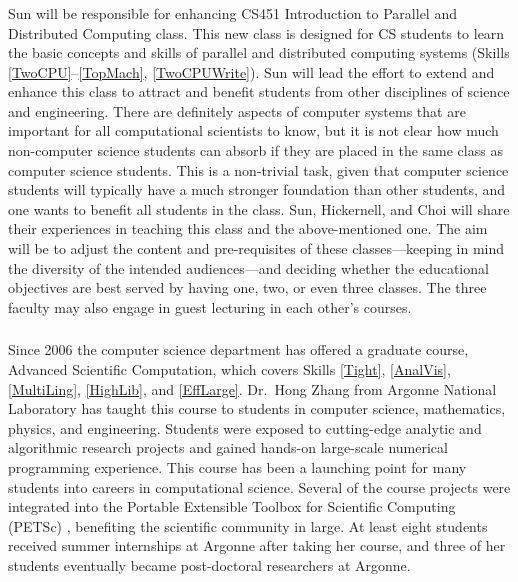 \documentclass[11pt]{NSFamsart}
\begin{document}
\subsubsection{\UGradParallelName} \label{UGradParallel} Sun will be responsible for enhancing CS451 Introduction to Parallel and Distributed Computing class. This new class is designed for CS students to learn the basic concepts and skills of parallel and distributed computing systems (Skills \ref{TwoCPU}--\ref{TopMach}, \ref{TwoCPUWrite}). Sun will lead the effort to extend and enhance this class to attract and benefit students from other disciplines of science and engineering. There are definitely aspects of computer systems that are important for all computational scientists to know, but it is not clear how much non-computer science students can absorb if they are placed in the same class as computer science students.  This is a non-trivial task, given that computer science students will typically have a much stronger foundation than other students, and one wants to benefit all students in the class.  Sun, Hickernell, and Choi will share their experiences in teaching this class and the above-mentioned one.  The aim will be to adjust the content and pre-requisites of these classes---keeping in mind the diversity of the intended audiences---and deciding whether the educational objectives are best served by having one, two, or even three classes.  The three faculty may also engage in guest lecturing in each other's courses.

\subsubsection{\LargeSCName} \label{LargeSC} Since 2006 the computer science department has offered a graduate course, Advanced Scientific Computation, which covers Skills \ref{Tight}, \ref{AnalVis}, \ref{MultiLing}, \ref{HighLib}, and \ref{EffLarge}.  Dr.~Hong Zhang from Argonne National Laboratory has taught this course to students in computer science, mathematics, physics, and engineering. Students were exposed to cutting-edge analytic and algorithmic research projects and gained hands-on large-scale numerical programming experience. This course has been a launching point for many students into careers in computational science.  Several of the course projects were integrated into the Portable Extensible Toolbox for Scientific Computing (PETSc) \cite{petsc-web-page17}, benefiting the scientific community in large. At least eight students received summer internships at Argonne after taking her course, and three of her students eventually became post-doctoral researchers at Argonne.  
\end{document}
